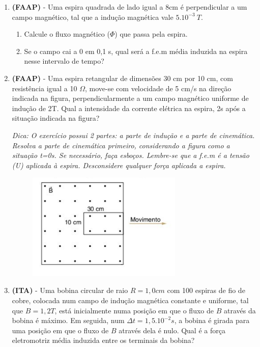 \documentclass[12pt,letterpaper,fleqn]{article}
\begin{document}
\begin{enumerate}
\item \textbf{(FAAP)} - Uma espira quadrada de lado igual a 8cm é perpendicular a um campo magnético, tal que a indução magnética vale $5.10^{-3}\: T$.

\begin{enumerate}
    \item Calcule o fluxo magnético ($\Phi$) que passa pela espira.
    \item Se o campo cai a 0 em 0,1 s, qual será a f.e.m média induzida na espira nesse intervalo de tempo?
\end{enumerate}

\item \textbf{(FAAP)} - Uma espira retangular de dimensões 30 cm por 10 cm, com resistência igual a 10 $\Omega$, move-se com velocidade de 5 cm/s na direção indicada na figura, perpendicularmente a um campo magnético uniforme de indução de 2T. Qual a intensidade da corrente elétrica na espira, 2s após a situação indicada na figura?

\textit{Dica: O exercício possui 2 partes: a parte de indução e a parte de cinemática. Resolva a parte de cinemática primeiro, considerando a figura como a situação t=0s. Se necessário, faça esboços. Lembre-se que a f.e.m é a tensão (U) aplicada à espira. Desconsidere qualquer força aplicada a espira.}

\begin{figure}[h]
    \centering
    \includegraphics[width=0.7\textwidth]{ex_9.png}
\end{figure}

\pagebreak
\item \textbf{(ITA)} - Uma bobina circular de raio $R=1,0cm$ com 100 espiras de fio de cobre, colocada num campo de indução magnética constante e uniforme, tal que $B=1,2T$, está inicialmente numa posição em que o fluxo de $B$ através da bobina é máximo. Em seguida, num $\Delta t=1,5.10^{-2}s$, a bobina é girada para uma posição em que o fluxo de $B$ através dela é nulo. Qual é a força eletromotriz média induzida entre os terminais da bobina?


\end{enumerate}
\end{document}
